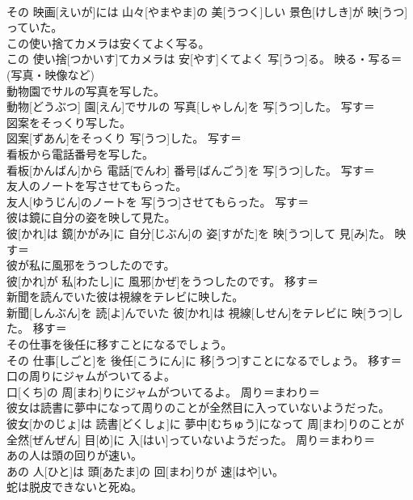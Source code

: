 \documentclass[8pt]{extreport}
\begin{document}
\begin{CJK}{UTF8}{min}
\\	その 映画[えいが]には 山々[やまやま]の 美[うつく]しい 景色[けしき]が 映[うつ]っていた。	
\\	この使い捨てカメラは安くてよく写る。	
\\	この 使い捨[つかいす]てカメラは 安[やす]くてよく 写[うつ]る。	映る・写る＝ 
\\	(写真・映像など) 
\\	動物園でサルの写真を写した。	
\\	動物[どうぶつ] 園[えん]でサルの 写真[しゃしん]を 写[うつ]した。	写す＝ 
\\	図案をそっくり写した。	
\\	図案[ずあん]をそっくり 写[うつ]した。	写す＝ 
\\	看板から電話番号を写した。	
\\	看板[かんばん]から 電話[でんわ] 番号[ばんごう]を 写[うつ]した。	写す＝ 
\\	友人のノートを写させてもらった。	
\\	友人[ゆうじん]のノートを 写[うつ]させてもらった。	写す＝ 
\\	彼は鏡に自分の姿を映して見た。	
\\	彼[かれ]は 鏡[かがみ]に 自分[じぶん]の 姿[すがた]を 映[うつ]して 見[み]た。	映す＝ 
\\	彼が私に風邪をうつしたのです。	
\\	彼[かれ]が 私[わたし]に 風邪[かぜ]をうつしたのです。	移す＝ 
\\	新聞を読んでいた彼は視線をテレビに映した。	
\\	新聞[しんぶん]を 読[よ]んでいた 彼[かれ]は 視線[しせん]をテレビに 映[うつ]した。	移す＝ 
\\	その仕事を後任に移すことになるでしょう。	
\\	その 仕事[しごと]を 後任[こうにん]に 移[うつ]すことになるでしょう。	移す＝ 
\\	口の周りにジャムがついてるよ。	
\\	口[くち]の 周[まわ]りにジャムがついてるよ。	周り＝まわり＝ 
\\	彼女は読書に夢中になって周りのことが全然目に入っていないようだった。	
\\	彼女[かのじょ]は 読書[どくしょ]に 夢中[むちゅう]になって 周[まわ]りのことが 全然[ぜんぜん] 目[め]に 入[はい]っていないようだった。	周り＝まわり＝ 
\\	あの人は頭の回りが速い。	
\\	あの 人[ひと]は 頭[あたま]の 回[まわ]りが 速[はや]い。	
\\	蛇は脱皮できないと死ぬ。	

\end{CJK}
\end{document}
